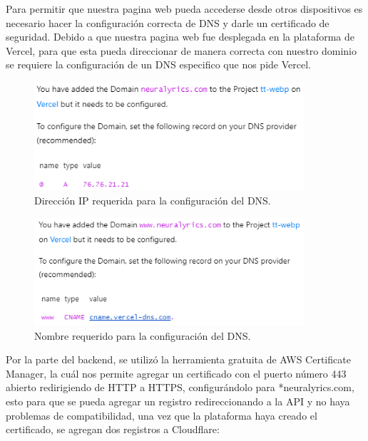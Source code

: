\documentclass[12pt, a4paper, titlepage]{article}
\begin{document}
	Para permitir que nuestra pagina web pueda accederse desde otros dispositivos es necesario hacer la configuración correcta de DNS y darle un certificado de seguridad. Debido a que nuestra pagina web fue desplegada en la plataforma de Vercel, para que esta pueda direccionar de manera correcta con nuestro dominio se requiere la configuración de un DNS especifico que nos pide Vercel.
	\begin{figure}[H] 
		\includegraphics[width=10cm]{./Imagenes/DnsSSL/Dns1.png}
		\centering \caption{Dirección IP requerida para la configuración del DNS.}
	\end{figure}
	\begin{figure}[H] 
		\includegraphics[width=10cm]{./Imagenes/DnsSSL/Dns2.png}
		\centering \caption{Nombre requerido para la configuración del DNS.}
	\end{figure}
	Por la parte del backend, se utilizó la herramienta gratuita de AWS Certificate Manager, la cuál nos permite agregar un certificado con el puerto número 443 abierto redirigiendo de HTTP a HTTPS, 	configurándolo para *neuralyrics.com, esto para que se pueda agregar un registro redireccionando a la API y no haya problemas de compatibilidad, una vez que la plataforma haya creado el certificado, se agregan dos registros a Cloudflare:
	
\end{document}
